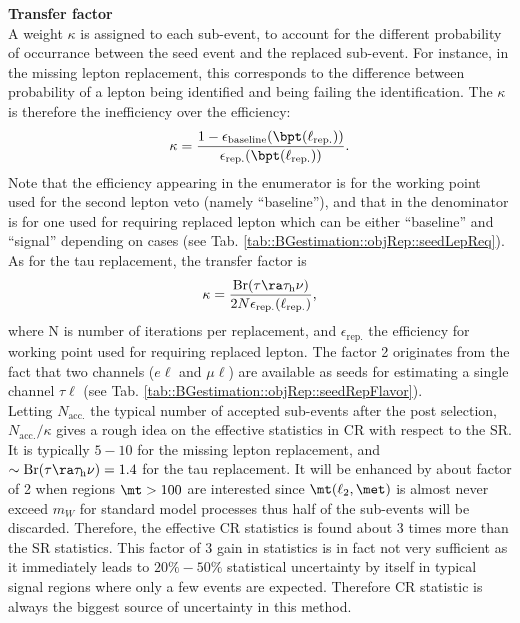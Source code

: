 
\noindent \textbf{Transfer factor} \\
A weight $\kappa$ is assigned to each sub-event, to account for the different probability of occurrance between the seed event and the replaced sub-event. For instance, in the missing lepton replacement, this corresponds to the difference between probability of a lepton being identified and being failing the identification. The $\kappa$ is therefore the inefficiency over the efficiency:
$$
\kappa = \frac{
  1-\epsilon_{\mathrm{baseline}}  (\bpt(\ell_{\mathrm{rep.}}))
}{
  \epsilon_{\mathrm{rep.}} (\bpt(\ell_{\mathrm{rep.}}))
}.
$$
Note that the efficiency appearing in the enumerator is for the working point used for the second lepton veto (namely ``baseline''), and that in the denominator is for one used for requiring replaced lepton which can be either ``baseline'' and ``signal'' depending on cases (see Tab. \ref{tab::BGestimation::objRep::seedLepReq}). \\

As for the tau replacement, the transfer factor is 
$$
\kappa = \frac{
  \mathrm{Br}(\tau\ra\tau_{\mathrm{h}}\nu)
}{
  2N\epsilon_{\mathrm{rep.}}(\ell_{\mathrm{rep.}})
},
$$
where N is number of iterations per replacement, and $\epsilon_{\mathrm{rep.}}$ the efficiency for working point used for requiring replaced lepton. The factor 2 originates from the fact that two channels ($e\ell$ and $\mu\ell$) are available as seeds for estimating a single channel $\tau\ell$ (see Tab. \ref{tab::BGestimation::objRep::seedRepFlavor}). \\

Letting $N_{\mathrm{acc.}}$ the typical number of accepted sub-events after the post selection, $N_{\mathrm{acc.}}/\kappa$ gives a rough idea on the effective statistics in CR with respect to the SR. It is typically $5-10$ for the missing lepton replacement, and $\sim \mathrm{Br}(\tau\ra\tau_{\mathrm{h}}\nu) = 1.4$ for the tau replacement. It will be enhanced by about factor of 2 when regions $\mt>100$ are interested since $\mt(\ell_{2},\met)$ is almost never exceed $m_W$ for standard model processes thus half of the sub-events will be discarded. Therefore, the effective CR statistics is found about 3 times more than the SR statistics. This factor of 3 gain in statistics is in fact not very sufficient as it immediately leads to $20\%-50\%$ statistical uncertainty by itself in typical signal regions where only a few events are expected. Therefore CR statistic is always the biggest source of uncertainty in this method. \\


